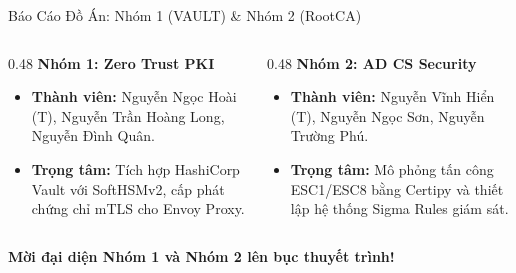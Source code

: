 \begin{frame}{Báo Cáo Đồ Án: Nhóm 1 (VAULT) \& Nhóm 2 (RootCA)}
  \begin{columns}[T]
    \begin{column}{0.48\textwidth}
      \textbf{Nhóm 1: Zero Trust PKI}
      \begin{itemize}\small
        \item \textbf{Thành viên:} Nguyễn Ngọc Hoài (T), Nguyễn Trần Hoàng Long, Nguyễn Đình Quân.
        \item \textbf{Trọng tâm:} Tích hợp HashiCorp Vault với SoftHSMv2, cấp phát chứng chỉ mTLS cho Envoy Proxy.
      \end{itemize}
    \end{column}
    \begin{column}{0.48\textwidth}
      \textbf{Nhóm 2: AD CS Security}
      \begin{itemize}\small
        \item \textbf{Thành viên:} Nguyễn Vĩnh Hiển (T), Nguyễn Ngọc Sơn, Nguyễn Trường Phú.
        \item \textbf{Trọng tâm:} Mô phỏng tấn công ESC1/ESC8 bằng Certipy và thiết lập hệ thống Sigma Rules giám sát.
      \end{itemize}
    \end{column}
  \end{columns}

  \vspace{0.6em}
  \centering\large\sffamily\bfseries\color{hcmutblue}
  Mời đại diện Nhóm 1 và Nhóm 2 lên bục thuyết trình!
\end{frame}


